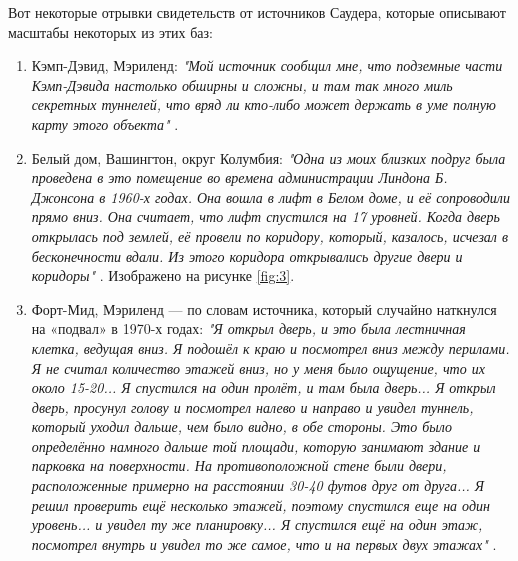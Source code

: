 \documentclass[10pt,twocolumn,letterpaper]{article}
\begin{document}
Вот некоторые отрывки свидетельств от источников Саудера, которые описывают масштабы некоторых из этих баз:
\begin{flushleft}
\begin{enumerate}
    \item Кэмп-Дэвид, Мэриленд: \textit{"Мой источник сообщил мне, что подземные части Кэмп-Дэвида настолько обширны и сложны, и там так много миль секретных туннелей, что вряд ли кто-либо может держать в уме полную карту этого объекта"} \cite{22}.
    \item Белый дом, Вашингтон, округ Колумбия: \textit{"Одна из моих близких подруг была проведена в это помещение во времена администрации Линдона Б. Джонсона в 1960-х годах. Она вошла в лифт в Белом доме, и её сопроводили прямо вниз. Она считает, что лифт спустился на 17 уровней. Когда дверь открылась под землей, её провели по коридору, который, казалось, исчезал в бесконечности вдали. Из этого коридора открывались другие двери и коридоры"} \cite{22}. Изображено на рисунке \ref{fig:3}.
    \item Форт-Мид, Мэриленд — по словам источника, который случайно наткнулся на «подвал» в 1970-х годах: \textit{"Я открыл дверь, и это была лестничная клетка, ведущая вниз. Я подошёл к краю и посмотрел вниз между перилами. Я не считал количество этажей вниз, но у меня было ощущение, что их около 15-20... Я спустился на один пролёт, и там была дверь... Я открыл дверь, просунул голову и посмотрел налево и направо и увидел туннель, который уходил дальше, чем было видно, в обе стороны. Это было определённо намного дальше той площади, которую занимают здание и парковка на поверхности. На противоположной стене были двери, расположенные примерно на расстоянии 30-40 футов друг от друга... Я решил проверить ещё несколько этажей, поэтому спустился еще на один уровень... и увидел ту же планировку... Я спустился ещё на один этаж, посмотрел внутрь и увидел то же самое, что и на первых двух этажах"} \cite{22}.
\end{enumerate}
\end{flushleft}
\end{document}
